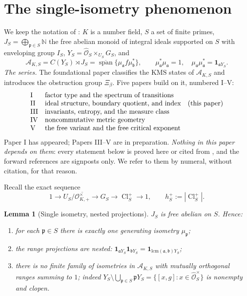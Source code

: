 \documentclass[11pt]{amsart}
\numberwithin{equation}{section}
\newtheorem{lemma}[theorem]{Lemma}
\theoremstyle{definition}
\theoremstyle{remark}
\newcommand{\N}{\mathbb{N}}
\newcommand{\cA}{\mathcal{A}}
\newcommand{\cO}{\mathcal{O}}
\newcommand{\hO}{\widehat{\cO}}
\newcommand{\pp}{\mathfrak{p}}
\newcommand{\aaa}{\mathfrak{a}}
\newcommand{\bb}{\mathfrak{b}}
\newcommand{\Cl}{\operatorname{Cl}}
\newcommand{\spn}{\operatorname{span}}
\begin{document}
\maketitle

\tableofcontents

\section{The single-isometry phenomenon}

We keep the notation of \cite{Main}: $K$ is a number field, $S$ a set of finite primes,
$J_S=\bigoplus_{\pp\in S}\N$ the free abelian monoid of integral ideals supported on $S$
with enveloping group $I_S$, $Y_S=\hO_S\times_{U_S}G_S$, and
\[
\cA_{K,S}=C(Y_S)\rtimes J_S=\overline{\spn}\bigl\{\mu_\aaa f\mu_\bb^*\bigr\},
\qquad \mu_\aaa^*\mu_\aaa=1,\quad \mu_\aaa\mu_\aaa^*=\mathbf 1_{\aaa Y_S}.
\]
\emph{The series.} The foundational paper \cite{Main} classifies the $\mathrm{KMS}$ states
of $\cA_{K,S}$ and introduces the obstruction group $\Xi_\beta$. Five papers build on it,
numbered I--V:
\[
\begin{array}{ll}
\text{I} & \text{factor type and the spectrum of transitions}\\
\text{II} & \text{ideal structure, boundary quotient, and index\quad(this paper)}\\
\text{III} & \text{invariants, entropy, and the measure class}\\
\text{IV} & \text{noncommutative metric geometry}\\
\text{V} & \text{the free variant and the free critical exponent}
\end{array}
\]
Paper I has appeared; Papers III--V are in preparation. \emph{Nothing in this paper depends
on them}: every statement below is proved here or cited from \cite{Main}, and the forward
references are signposts only. We refer to them by numeral, without citation, for that
reason.

Recall the exact sequence \cite[(2.1)]{Main}
\begin{equation}\label{eq:exact}
1\to U_S/\overline{\cO^\times_{K,+}}\to G_S\to\Cl^+_S\to1,\qquad h^+_S:=|\Cl^+_S| .
\end{equation}

\begin{lemma}[Single isometry, nested projections]\label{lem:single}
$J_S$ is free abelian on $S$. Hence:
\begin{enumerate}
\item for each $\pp\in S$ there is exactly one generating isometry $\mu_\pp$;
\item the range projections are \emph{nested}:
$\mathbf 1_{\aaa Y_S}\mathbf 1_{\bb Y_S}=\mathbf 1_{\mathrm{lcm}(\aaa,\bb)Y_S}$;
\item there is no finite family of isometries in $\cA_{K,S}$ with mutually orthogonal ranges
summing to $1$; indeed
$Y_S\setminus\bigcup_{\pp\in S}\pp Y_S=\{[x,g]:x\in\hO_S^\times\}$ is nonempty and clopen.
\end{enumerate}
\end{lemma}
\end{document}
